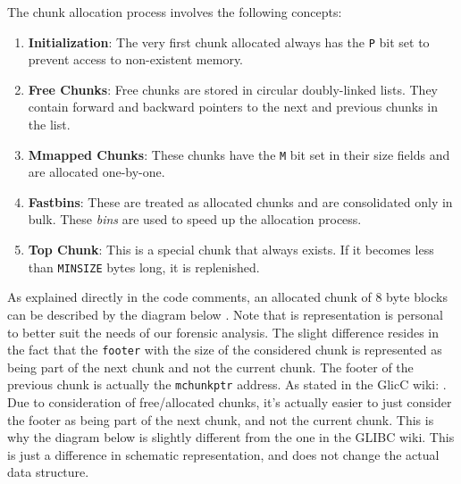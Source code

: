     The chunk allocation process involves the following concepts: 

    \begin{enumerate}
        \item \textbf{Initialization}: The very first chunk allocated always has the \texttt{P} bit set to prevent access to non-existent memory.
        
        \item \textbf{Free Chunks}: Free chunks are stored in circular doubly-linked lists. They contain forward and backward pointers to the next and previous chunks in the list.
        
        \item \textbf{Mmapped Chunks}: These chunks have the \texttt{M} bit set in their size fields and are allocated one-by-one.
        
        \item \textbf{Fastbins}: These are treated as allocated chunks and are consolidated only in bulk. These \textit{bins} are used to speed up the allocation process.
        
        \item \textbf{Top Chunk}: This is a special chunk that always exists. If it becomes less than \texttt{MINSIZE} bytes long, it is replenished.
    \end{enumerate}

    As explained directly in the code comments, an allocated chunk of 8 byte blocks can be described by the diagram below \cite{MallocGLIBC2001}. Note that is representation is personal to better suit the needs of our forensic analysis. The slight difference resides in the fact that the \texttt{footer} with the size of the considered chunk is represented as being part of the next chunk and not the current chunk. The footer of the previous chunk is actually the \texttt{mchunkptr} address. As stated in the GlicC wiki:  \cite{MallocInternalsWiki2023}. Due to consideration of free/allocated chunks, it's actually easier to just consider the footer as being part of the next chunk, and not the current chunk. This is why the diagram below is slightly different from the one in the GLIBC wiki. This is just a difference in schematic representation, and does not change the actual data structure.


